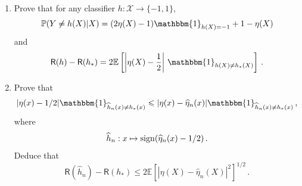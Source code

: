 \documentclass[a4paper,10pt,fleqn]{article}
\newcommand{\eqsp}{\,}
\newcommand{\bP}{\mathbb{P}}
\newcommand{\1}{\ensuremath{\mathbbm{1}}}
\newcommand{\bE}{\mathbb{E}}
\begin{document}
\begin{enumerate}
\item Prove that for any classifier $h:\mathcal{X}\to \{-1,1\}$,
$$
\bP(Y\neq h(X)|X) = (2\eta(X)-1)\1_{h(X)=-1}+1-\eta(X)
$$
and
$$
\mathsf{R}(h)-\mathsf{R}(h_{*})=2\bE \left[\left|\eta(X)-\frac{1}{2}\right|\eqsp\1_{h(X)\neq h_*(X)}\right]\eqsp.
$$
%
%
\item Prove that 
$$
|\eta(x)-1/2|\1_{\widehat h_n(x)\neq h_{*}(x)}\leqslant |\eta(x)-\widehat \eta_n(x)|\1_{\widehat h_n(x)\neq h_{*}(x)}\eqsp,
$$
where
$$
\widehat h_n:x \mapsto{\rm sign}(\widehat \eta_n(x)-1/2)\eqsp.
$$
Deduce that 
$$
\mathsf{R}(\widehat h_n)-\mathsf{R}(h_*)\leqslant  2 \bE[|\eta(X) - \widehat \eta_n(X)|^2]^{1/2}\eqsp.
$$
%
%
\end{enumerate}
\end{document}
